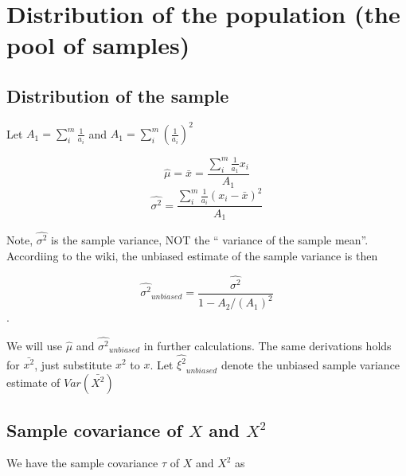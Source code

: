 \documentclass{article}
\begin{document}
\newcommand{\Lemma}[1]{Lemma~\ref{#1}}
\newcommand{\kristoffer}[1]{{\color{red}{#1}}}
\newcommand{\alex}[1]{{\color{blue}{#1}}}

\newcommand{\DB}{\mathsf{DB}_{k,a}}
\newcommand{\U}{\mathsf{U}_{k,a}}
\newcommand{\ST}{\mathsf{ST}_{k,a}}
\newcommand{\UN}{\mathsf{UN}_{k,a}}
\newcommand{\dplus}{\delta^+_{k,a}}
\newcommand{\dminus}{\delta^-_{k,a}}
\newcommand{\K}{\mathsf{K}}
\newcommand{\abu}{\alpha}
\newcommand{\esize}{{\sf E_{size}}}
\newcommand{\isstart}{{\sf isStart}_{k,a}}
\newcommand{\isunary}{{\sf isUnary}_{k,a}}
\newcommand{\RLCSA}{{\sf RLCSA}}
\newcommand{\st}{\:|\:}
\renewcommand{\geq}{\geqslant}
\renewcommand{\ge}{\geqslant}
\renewcommand{\leq}{\leqslant}
\renewcommand{\le}{\leqslant}
\newcommand{\Var}{\text{Var}}
\newcommand{\Cov}{\text{Cov}}
\newcommand{\E}{\text{E}}

\section{Distribution of the population (the pool of samples)}
\label{sec:title}

\subsection{Distribution of the sample}
\label{ssec:subtitle}

Let $A_1 = \sum_{i}^m \frac{1}{a_i}$ and $A_1 = \sum_{i}^m (\frac{1}{a_i})^2$

\[\hat{\mu} = \bar{x} = \frac{\sum_{i}^m \frac{1}{a_1}x_i}{A_1} \]
\[\hat{\sigma^2} = \frac{\sum_{i}^m \frac{1}{a_i}(x_i-\bar{x})^2}{A_1} \]

Note, $\hat{\sigma^2}$ is the sample variance, NOT the `` variance of the sample mean''. Accordiing to the wiki, the unbiased estimate of the sample variance is then

\[\hat{\sigma^2}_{unbiased} =  \frac{\hat{\sigma^2}}{1- A_2/(A_1)^2 } \].

We will use $\hat{\mu}$ and $\hat{\sigma^2}_{unbiased}$ in further calculations. The same derivations holds for $\bar{x^2}$, just substitute $x^2$ to $x$. Let $\hat{\xi^2}_{unbiased}$ denote the unbiased sample variance estimate of $Var(\bar{X^2})$ 



\subsection{Sample covariance of $X$ and $X^2$}
\label{ssec:subtitle}
We have the sample covariance $\tau$ of $X$ and $X^2$ as 
\end{document}
